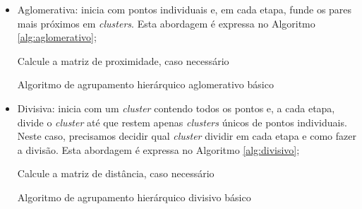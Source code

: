 \begin{itemize}
    \begin{itemize}
        \item Aglomerativa: inicia com pontos individuais e, em cada etapa, funde os pares mais próximos em \textit{clusters}. Esta abordagem é expressa no Algoritmo \ref{alg:aglomerativo};
        
        \begin{algorithm}[!htb]
            \SetAlgoLined
            Calcule a matriz de proximidade, caso necessário\;
        \caption{Algoritmo de agrupamento hierárquico aglomerativo básico}
        \label{alg:aglomerativo}
        \end{algorithm}
        
        \item Divisiva: inicia com um \textit{cluster} contendo todos os pontos e, a cada etapa, divide o \textit{cluster} até que restem apenas \textit{clusters} únicos de pontos individuais. Neste caso, precisamos decidir qual \textit{cluster} dividir em cada etapa e como fazer a divisão. Esta abordagem é expressa no Algoritmo \ref{alg:divisivo};
        
        \begin{algorithm}[!htb]
            \SetAlgoLined
            Calcule a matriz de distância, caso necessário\;
        \caption{Algoritmo de agrupamento hierárquico divisivo básico}
        \label{alg:divisivo}
        \end{algorithm}
        
    \end{itemize}
    

\end{itemize}
